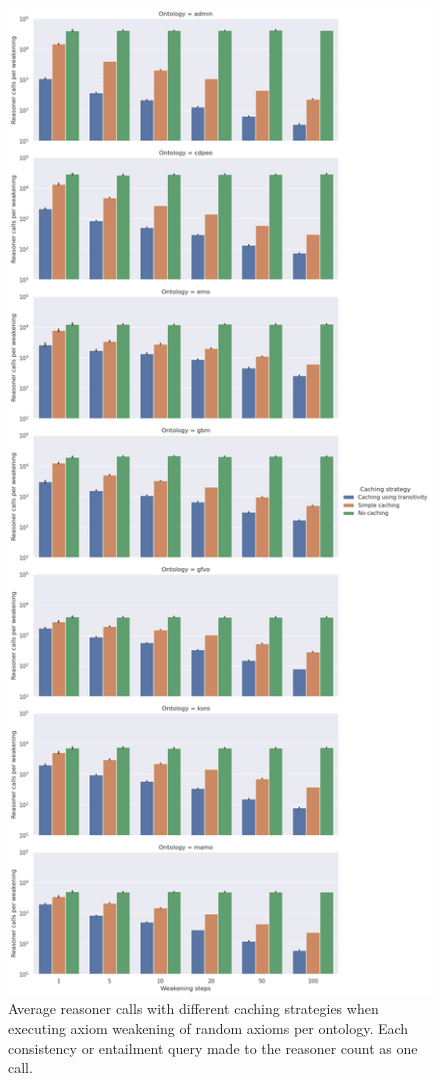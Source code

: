 \begin{figure}[ht]
    \centering
    \includegraphics[height=0.9\textheight]{resources/calls-cache-ontology-bar.png}
    \caption{Average reasoner calls with different caching strategies when executing axiom weakening of random axioms per ontology. Each consistency or entailment query made to the reasoner count as one call.}
\end{figure}

